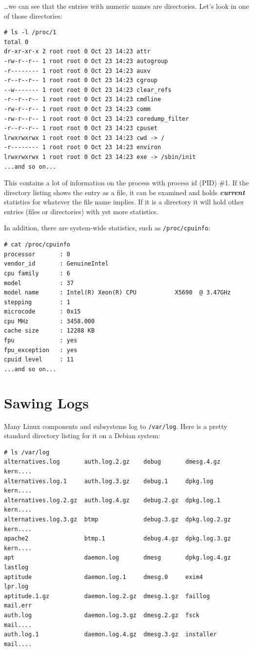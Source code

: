\documentclass[10pt,]{book}
\numberwithin{figure}{chapter}
\begin{document}
\ldots{}we can see that the entries with numeric names are directories.
Let's look in one of those directories:

\begin{verbatim}
# ls -l /proc/1
total 0
dr-xr-xr-x 2 root root 0 Oct 23 14:23 attr
-rw-r--r-- 1 root root 0 Oct 23 14:23 autogroup
-r-------- 1 root root 0 Oct 23 14:23 auxv
-r--r--r-- 1 root root 0 Oct 23 14:23 cgroup
--w------- 1 root root 0 Oct 23 14:23 clear_refs
-r--r--r-- 1 root root 0 Oct 23 14:23 cmdline
-rw-r--r-- 1 root root 0 Oct 23 14:23 comm
-rw-r--r-- 1 root root 0 Oct 23 14:23 coredump_filter
-r--r--r-- 1 root root 0 Oct 23 14:23 cpuset
lrwxrwxrwx 1 root root 0 Oct 23 14:23 cwd -> /
-r-------- 1 root root 0 Oct 23 14:23 environ
lrwxrwxrwx 1 root root 0 Oct 23 14:23 exe -> /sbin/init
...and so on...
\end{verbatim}

This contains a lot of information on the process with process id (PID)
\#1. If the directory listing shows the entry as a file, it can be
examined and holds \textbf{\emph{current}} statistics for whatever the
file name implies. If it is a directory it will hold other entries
(files or directories) with yet more statistics.

In addition, there are system-wide statistics, such as
\texttt{/proc/cpuinfo}:

\begin{verbatim}
# cat /proc/cpuinfo
processor       : 0
vendor_id       : GenuineIntel
cpu family      : 6
model           : 37
model name      : Intel(R) Xeon(R) CPU           X5690  @ 3.47GHz
stepping        : 1
microcode       : 0x15
cpu MHz         : 3458.000
cache size      : 12288 KB
fpu             : yes
fpu_exception   : yes
cpuid level     : 11
...and so on...
\end{verbatim}

\section{Sawing Logs}\label{sawing-logs}

Many Linux components and subsystems log to \texttt{/var/log}. Here is a
pretty standard directory listing for it on a Debian system:

\begin{verbatim}
# ls /var/log
alternatives.log       auth.log.2.gz    debug       dmesg.4.gz     kern....
alternatives.log.1     auth.log.3.gz    debug.1     dpkg.log       kern....
alternatives.log.2.gz  auth.log.4.gz    debug.2.gz  dpkg.log.1     kern....
alternatives.log.3.gz  btmp             debug.3.gz  dpkg.log.2.gz  kern....
apache2                btmp.1           debug.4.gz  dpkg.log.3.gz  kern....
apt                    daemon.log       dmesg       dpkg.log.4.gz  lastlog
aptitude               daemon.log.1     dmesg.0     exim4          lpr.log
aptitude.1.gz          daemon.log.2.gz  dmesg.1.gz  faillog        mail.err
auth.log               daemon.log.3.gz  dmesg.2.gz  fsck           mail....
auth.log.1             daemon.log.4.gz  dmesg.3.gz  installer      mail....
\end{verbatim}
\end{document}
